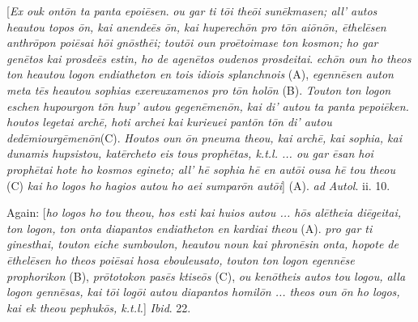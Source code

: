 [\emph{Ex ouk ont\={o}n ta panta epoi\={e}sen}. \emph{ou gar ti
t\={o}i the\={o}i sun\={e}kmasen; all' autos heautou topos \={o}n,
kai anende\={e}s \={o}n, kai huperech\={o}n pro t\={o}n ai\={o}n\={o}n,
\={e}thel\={e}sen anthr\={o}pon poi\={e}sai h\={o}i gn\={o}sth\={e}i;
tout\={o}i oun pro\={e}toimase ton kosmon; ho gar gen\={e}tos
kai prosde\={e}s estin, ho de agen\={e}tos oudenos prosdeitai}.
\emph{ech\={o}n oun ho theos ton heautou logon endiatheton en tois
idiois splanchnois} (A), \emph{egenn\={e}sen auton meta t\={e}s
heautou sophias exereuxamenos pro t\={o}n hol\={o}n} (B). \emph{Touton
ton logon eschen hupourgon t\={o}n hup' autou gegen\={e}men\={o}n,
kai di' autou ta panta pepoi\={e}ken. houtos legetai arch\={e},
hoti archei kai kurieuei pant\={o}n t\={o}n di' autou ded\={e}miourg\={e}men\={o}n}(C). \emph{Houtos oun \={o}n pneuma theou, kai arch\={e}, kai
sophia, kai dunamis hupsistou, kat\={e}rcheto eis tous} \emph{proph\={e}tas,
k.t.l. ... ou gar \={e}san hoi proph\={e}tai hote ho kosmos
egineto; all' h\={e} sophia h\={e} en aut\={o}i ousa h\={e}
tou theou} (C) \emph{kai ho logos ho hagios autou ho aei sumpar\={o}n
aut\={o}i}] (A). \emph{ad Autol}. ii. 10.

Again: [\emph{ho logos ho tou theou, hos esti kai huios autou ... h\={o}s
al\={e}theia di\={e}geitai, ton logon, ton onta diapantos
endiatheton en kardiai theou} (A). \emph{pro gar ti ginesthai, touton
eiche sumboulon, heautou noun kai phron\={e}sin onta, hopote de \={e}thel\={e}sen
ho theos poi\={e}sai hosa ebouleusato, touton ton logon egenn\={e}se
prophorikon} (B), \emph{pr\={o}totokon pas\={e}s ktise\={o}s}
(C), \emph{ou ken\={o}theis autos tou logou, alla logon genn\={e}sas,
kai t\={o}i log\={o}i autou diapantos homil\={o}n ... theos
oun \={o}n ho logos, kai ek theou pephuk\={o}s, k.t.l.}] \emph{Ibid}.
22.

